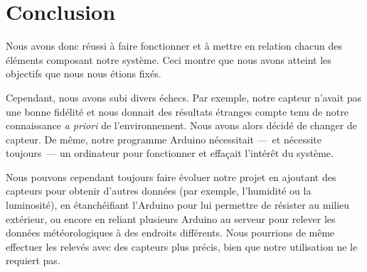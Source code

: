 \chapter*{Conclusion}

Nous avons donc réussi à faire fonctionner et à mettre en relation chacun des éléments composant notre système. Ceci montre que nous avons atteint les objectifs que nous nous étions fixés.

Cependant, nous avons subi divers échecs. Par exemple, notre capteur n'avait pas une bonne fidélité et nous donnait des résultats étranges compte tenu de notre connaissance \emph{a priori} de l'environnement. Nous avons alors décidé de changer de capteur. De même, notre programme Arduino nécessitait ---~et nécessite toujours~--- un ordinateur pour fonctionner et effaçait l'intérêt du système.

Nous pouvons cependant toujours faire évoluer notre projet en ajoutant des capteurs pour obtenir d'autres données (par exemple, l'humidité ou la luminosité), en étanchéifiant l'Arduino pour lui permettre de résister au milieu extérieur, ou encore en reliant plusieurs Arduino au serveur pour relever les données météorologiques à des endroits différents. Nous pourrions de même effectuer les relevés avec des capteurs plus précis, bien que notre utilisation ne le requiert pas.
